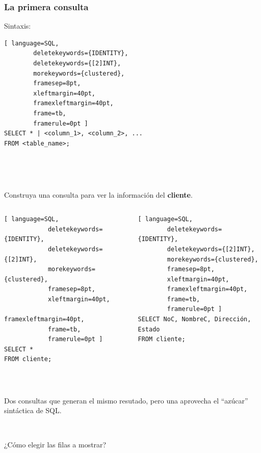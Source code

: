 \documentclass[
	10pt, %
	aspectratio=169, %
]{beamer}
\begin{document}
\begin{frame}[fragile]
	
	\frametitle{La primera consulta}
	
	Sintaxis:
	\begin{lstlisting}[ language=SQL,
		deletekeywords={IDENTITY},
		deletekeywords={[2]INT},
		morekeywords={clustered},
		framesep=8pt,
		xleftmargin=40pt,
		framexleftmargin=40pt,
		frame=tb,
		framerule=0pt ]
SELECT * | <column_1>, <column_2>, ...
FROM <table_name>;
\end{lstlisting}

	\ 
	
	\  
	
		
	Construya una consulta para ver la información del \textbf{cliente}.
	
	\pause

	\begin{columns}[t]
		\begin{lstlisting}[ language=SQL,
			deletekeywords={IDENTITY},
			deletekeywords={[2]INT},
			morekeywords={clustered},
			framesep=8pt,
			xleftmargin=40pt,
			framexleftmargin=40pt,
			frame=tb,
			framerule=0pt ]
SELECT *
FROM cliente;
\end{lstlisting}
	
	
		\begin{lstlisting}[ language=SQL,
		deletekeywords={IDENTITY},
		deletekeywords={[2]INT},
		morekeywords={clustered},
		framesep=8pt,
		xleftmargin=40pt,
		framexleftmargin=40pt,
		frame=tb,
		framerule=0pt ]
SELECT NoC, NombreC, Dirección, Estado
FROM cliente;
\end{lstlisting}
	
	\end{columns}
	
	\pause
	
	\ 
	
	Dos consultas que generan el mismo resutado, pero una aprovecha el ``azúcar'' sintáctica de SQL.
	
	\pause
	
	\ 
	
	\textcolor{codepurple}{¿Cómo elegir las filas a mostrar?}
			
\end{frame}

\end{document}
